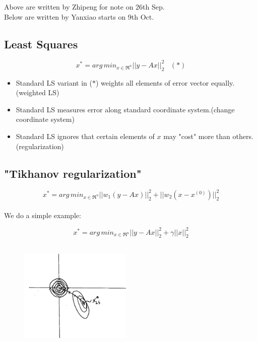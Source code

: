 Above are written by Zhipeng for note on 26th Sep. \\

Below are written by Yanxiao starts on 9th Oct. \\

\subsection{Least Squares}
\begin{equation*}
x^* = arg\, min_{x\in \Re^n}||y-Ax||_2^2 \,\,\,\,\, (*)
\end{equation*}

\begin{itemize}
	\item Standard LS variant in ($*$) weights all elements of error vector equally.(weighted LS)
	
	\item Standard LS measures error along standard coordinate system.(change coordinate system)
	
	\item Standard LS ignores that certain elements of $x$ may "cost" more than others.(regularization)
\end{itemize}

\subsection{"Tikhanov regularization"}
\begin{equation*}
x^* =arg\,min_{x\in \Re^n}||w_1(y-Ax)||_2^2 + ||w_2(x - x^{(0)})||_2^2
\end{equation*}\\

We do a simple example:

\begin{equation*}
x^* = arg\,min_{x\in \Re^n}||y-Ax||_2^2 + \gamma||x||_2^2
\end{equation*}

\begin{figure}
	\centering
	\includegraphics[width=2.1in,height=2.1in]{figures/ch06/figure4.png}
\end{figure}

